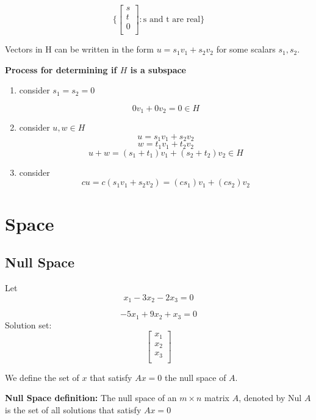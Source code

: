 \begin{equation}
\Biggl\{
\begin{bmatrix}
	s\\
	t\\
	0\\
\end{bmatrix}: \mbox{s and t are real}
\Biggr\}
\end{equation}


Vectors in H can be written in the form $u=s_{1}v_{1}+s_{2}v_{2}$ for some scalars $s_{1},s_{2}$.



\hfill

\textbf{Process for determining  if $H$ is a subspace}
\begin{enumerate}
	\item consider $s_{1}=s_{2}=0$

    \[0v_{1}+0v_{2}=0 \in H\]

\item consider $u,w\in H$
\[u=s_{1}v_{1}+s_{2}v_{2}     \]
\[w=t_{1}v_{1}+t_{2}v_{2}\]
\[u+w=(s_{1}+t_{1})v_{1}+(s_{2}+t_{2})v_{2}\in H\]

\item consider \[cu=c (s_{1}v_{1}+s_{2}v_{2})= (cs_{1}) v_{1}+ (cs_{2}) v_{2}\]
\end{enumerate}

\section{Space}

\subsection{Null Space}



Let
\[
	x_{1}-3x_{2}-2x_{3}=0
\]

\[
	-5x_{1}+9x_{2}+x_{3}=0
\]
Solution set:
\[
\begin{bmatrix}
	x_{1}\\
	x_{2}\\
	x_{3}\\
\end{bmatrix}
\]

We define the set of $ x $  that satisfy $Ax=0$ the null space of $A$.

\hfill
\hfill


\textbf{Null Space definition: }The null space of an $m\times n $ matrix $A$, denoted by Nul $A$ is the set of all solutions that satisfy $Ax=0$

